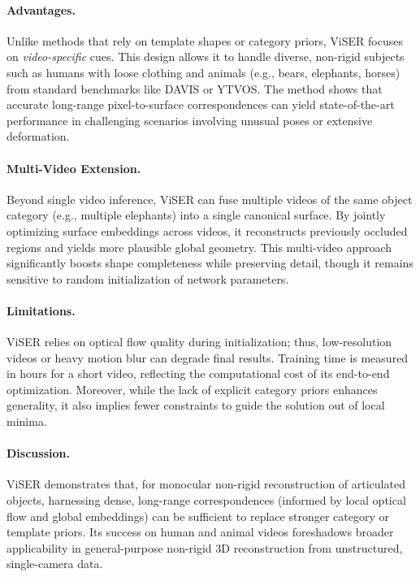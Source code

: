 \documentclass[11pt]{article}
\begin{document}
\paragraph{Advantages.} 
Unlike methods that rely on template shapes or category priors, ViSER focuses on \emph{video-specific} cues. This design allows it to handle diverse, non-rigid subjects such as humans with loose clothing and animals (e.g., bears, elephants, horses) from standard benchmarks like DAVIS or YTVOS. The method shows that accurate long-range pixel-to-surface correspondences can yield state-of-the-art performance in challenging scenarios involving unusual poses or extensive deformation.

\paragraph{Multi-Video Extension.} 
Beyond single video inference, ViSER can fuse multiple videos of the same object category (e.g., multiple elephants) into a single canonical surface. By jointly optimizing surface embeddings across videos, it reconstructs previously occluded regions and yields more plausible global geometry. This multi-video approach significantly boosts shape completeness while preserving detail, though it remains sensitive to random initialization of network parameters.

\paragraph{Limitations.} 
ViSER relies on optical flow quality during initialization; thus, low-resolution videos or heavy motion blur can degrade final results. Training time is measured in hours for a short video, reflecting the computational cost of its end-to-end optimization. Moreover, while the lack of explicit category priors enhances generality, it also implies fewer constraints to guide the solution out of local minima.

\paragraph{Discussion.} 
ViSER demonstrates that, for monocular non-rigid reconstruction of articulated objects, harnessing dense, long-range correspondences (informed by local optical flow and global embeddings) can be sufficient to replace stronger category or template priors. Its success on human and animal videos foreshadows broader applicability in general-purpose non-rigid 3D reconstruction from unstructured, single-camera data.
\end{document}

